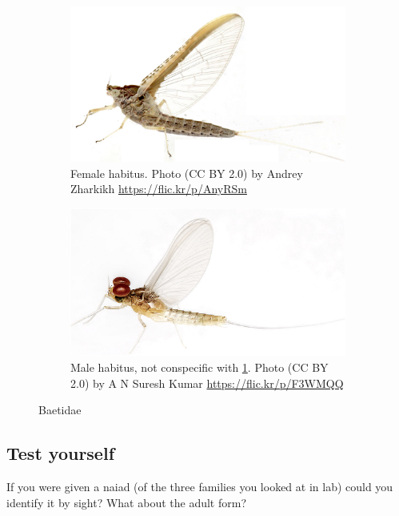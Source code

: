 \documentclass[letterpaper, 11pt]{article}
\begin{document}
\begin{figure}[ht!]
    \centering
    \begin{subfigure}[ht!]{0.45\textwidth}
        \includegraphics[width=\textwidth]{BaetidaeFemHabitus}
        \caption{Female habitus. Photo (CC BY 2.0) by Andrey Zharkikh \url{https://flic.kr/p/AnyRSm}}
        \label{fig:baetid1}
    \end{subfigure}
    \hfill
    \begin{subfigure}[ht!]{0.45\textwidth}
        \includegraphics[width=\textwidth]{BaetidaeMaleHabitus}
        \caption{Male habitus, not conspecific with \ref{fig:baetid1}. Photo (CC BY 2.0) by A N Suresh Kumar \url{https://flic.kr/p/F3WMQQ}}
        \label{fig:baetid2}
    \end{subfigure}
    \caption{Baetidae}\label{fig:baetids}
\end{figure}

\subsection*{Test yourself}
If you were given a naiad (of the three families you looked at in lab) could you identify it by sight? What about the adult form?
\end{document}
